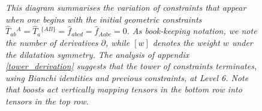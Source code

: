 \documentclass[twocolumn]{article}
\begin{document}
\begin{figure}[ht]
\caption{\textit{This diagram summarises the variation of constraints that appear when one begins with the initial geometric constraints $\hat T_{ab}{}^A = \hat T_a{}^{\{AB\}} = \hat f_{abcd} = \hat f_{Aabc} = 0$. As book-keeping notation, we note the number of derivatives $\partial$, while $[w]$ denotes the weight $w$ under the dilatation symmetry. The analysis of appendix \ref{tower_derivation} suggests that the tower of constraints terminates, using Bianchi identities and previous constraints, at Level 6. Note that boosts act vertically mapping tensors in the bottom row into tensors in the top row.}}
\label{fig:tower}
\end{figure}
\end{document}
